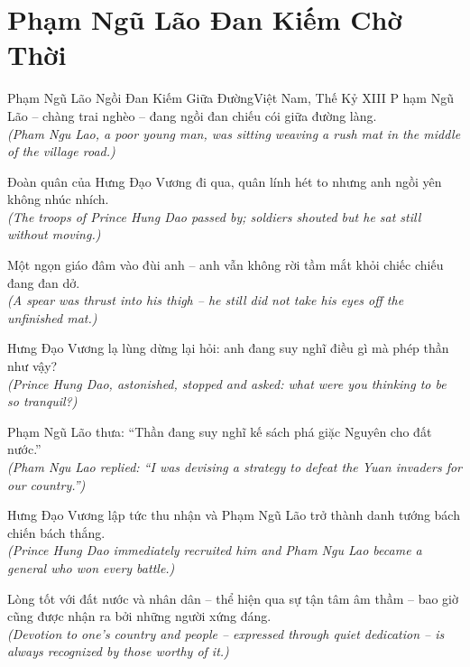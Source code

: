 \section{Phạm Ngũ Lão Đan Kiếm Chờ Thời}
\begin{truyen}{Phạm Ngũ Lão Ngồi Đan Kiếm Giữa Đường}{Việt Nam, Thế Kỷ XIII}
P hạm Ngũ Lão -- chàng trai nghèo -- đang ngồi đan chiếu cói giữa đường làng.\\
\textit{(Pham Ngu Lao, a poor young man, was sitting weaving a rush mat in the middle of the village road.)}

Đoàn quân của Hưng Đạo Vương đi qua, quân lính hét to nhưng anh ngồi yên không nhúc nhích.\\
\textit{(The troops of Prince Hung Dao passed by; soldiers shouted but he sat still without moving.)}

Một ngọn giáo đâm vào đùi anh -- anh vẫn không rời tầm mắt khỏi chiếc chiếu đang đan dở.\\
\textit{(A spear was thrust into his thigh -- he still did not take his eyes off the unfinished mat.)}

Hưng Đạo Vương lạ lùng dừng lại hỏi: anh đang suy nghĩ điều gì mà phép thần như vậy?\\
\textit{(Prince Hung Dao, astonished, stopped and asked: what were you thinking to be so tranquil?)}

Phạm Ngũ Lão thưa: ``Thần đang suy nghĩ kế sách phá giặc Nguyên cho đất nước.''\\
\textit{(Pham Ngu Lao replied: ``I was devising a strategy to defeat the Yuan invaders for our country.'')}

Hưng Đạo Vương lập tức thu nhận và Phạm Ngũ Lão trở thành danh tướng bách chiến bách thắng.\\
\textit{(Prince Hung Dao immediately recruited him and Pham Ngu Lao became a general who won every battle.)}

\end{truyen}
\begin{baihoc}
  Lòng tốt với đất nước và nhân dân -- thể hiện qua sự tận tâm âm thầm -- bao giờ cũng được nhận ra bởi những người xứng đáng.\\
  \textit{(Devotion to one's country and people -- expressed through quiet dedication -- is always recognized by those worthy of it.)}
\end{baihoc}
